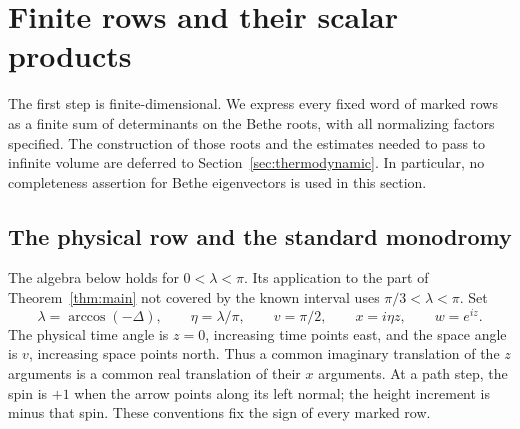 \section{Finite rows and their scalar products}\label{sec:finite}

The first step is finite-dimensional.  We express every fixed word of
marked rows as a finite sum of determinants on the Bethe roots, with all
normalizing factors specified.  The construction of those roots and the
estimates needed to pass to infinite volume are deferred to
Section~\ref{sec:thermodynamic}.  In particular, no completeness assertion
for Bethe eigenvectors is used in this section.

\subsection{The physical row and the standard monodromy}

The algebra below holds for $0<\lambda<\pi$.  Its application to the part
of Theorem~\ref{thm:main} not covered by the known interval uses
$\pi/3<\lambda<\pi$.  Set
\begin{equation}\label{eq:spectral-coordinates}
 \lambda=\arccos(-\Delta),\qquad \eta=\lambda/\pi,\qquad
 v=\pi/2,\qquad x=i\eta z,\qquad w=e^{iz}.
\end{equation}
The physical time angle is $z=0$, increasing time points east, and the
space angle is $v$, increasing space points north.  Thus a common
imaginary translation of the $z$ arguments is a common real translation
of their $x$ arguments.  At a path step, the spin is $+1$ when the arrow
points along its left normal; the height increment is minus that spin.
These conventions fix the sign of every marked row.

